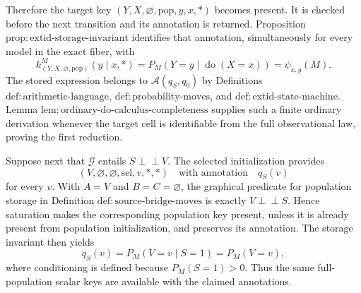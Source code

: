 Therefore the target key \((Y,X,\varnothing,\mathrm{pop},y,x,\ast)\) becomes present.  It is checked before the next transition and its annotation is returned.  Proposition \(\mathrm{prop{:}extid\text{-}storage\text{-}invariant}\) identifies that annotation, simultaneously for every model in the exact fiber, with
\[
k^M_{(Y,X,\varnothing,\mathrm{pop})}(y\mid x,\ast)
=P_M(Y=y\mid\operatorname{do}(X=x))
=\psi_{x,y}(M). \tag{3}
\]
The stored expression belongs to \(\mathcal A(q_S,q_0)\) by Definitions \(\mathrm{def{:}arithmetic\text{-}language}\), \(\mathrm{def{:}probability\text{-}moves}\), and \(\mathrm{def{:}extid\text{-}state\text{-}machine}\).  Lemma \(\mathrm{lem{:}ordinary\text{-}do\text{-}calculus\text{-}completeness}\) supplies such a finite ordinary derivation whenever the target cell is identifiable from the full observational law, proving the first reduction.

Suppose next that \(\mathcal G\) entails \(S\perp\!\!\!\perp V\).  The selected initialization provides
\[
(V,\varnothing,\varnothing,\mathrm{sel},v,\ast,\ast)
\quad\text{with annotation}\quad q_S(v)
\]
for every \(v\).  With \(A=V\) and \(B=C=\varnothing\), the graphical predicate for population storage in Definition \(\mathrm{def{:}source\text{-}bridge\text{-}moves}\) is exactly \(V\perp\!\!\!\perp S\).  Hence saturation makes the corresponding population key present, unless it is already present from population initialization, and preserves its annotation.  The storage invariant then yields
\[
q_S(v)=P_M(V=v\mid S=1)=P_M(V=v), \tag{4}
\]
where conditioning is defined because \(P_M(S=1)>0\).  Thus the same full-population scalar keys are available with the claimed annotations.

